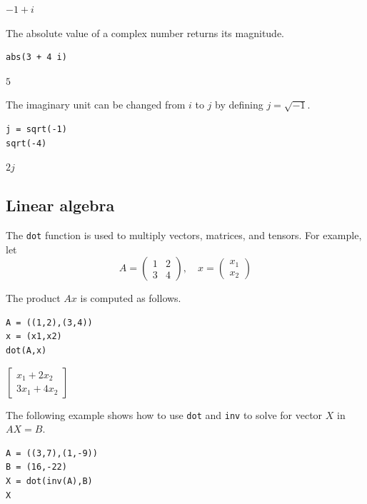 \documentclass[12pt]{article}
\begin{document}
$\displaystyle -1+i$

\bigskip

The absolute value of a complex number returns its magnitude.

{\color{blue}
\begin{verbatim}
abs(3 + 4 i)
\end{verbatim}
}

$\displaystyle 5$

\bigskip

The imaginary unit can be changed from $i$ to $j$
by defining $j=\sqrt{-1}$.

{\color{blue}
\begin{verbatim}
j = sqrt(-1)
sqrt(-4)
\end{verbatim}
}

$\displaystyle 2j$

\subsection{Linear algebra}

The \verb$dot$ function is used to multiply vectors, matrices, and tensors.
For example, let
\begin{equation*}
A=\begin{pmatrix}1&2\\3&4\end{pmatrix},
\quad
x=\begin{pmatrix}x_1\\x_2\end{pmatrix}
\end{equation*}

The product $Ax$ is computed as follows.

{\color{blue}
\begin{verbatim}
A = ((1,2),(3,4))
x = (x1,x2)
dot(A,x)
\end{verbatim}
}

$\displaystyle
\begin{bmatrix}
x_1+2x_2
\\[1ex]
3x_1+4x_2
\end{bmatrix}
$

\bigskip

The following example shows how to use \verb$dot$ and \verb$inv$ to solve for
vector $X$ in $AX=B$.

{\color{blue}
\begin{verbatim}
A = ((3,7),(1,-9))
B = (16,-22)
X = dot(inv(A),B)
X
\end{verbatim}
}
\end{document}
